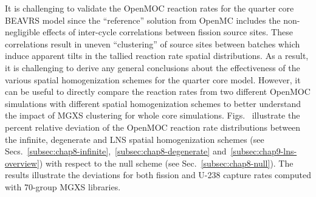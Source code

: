 \begin{appendices}
It is challenging to validate the OpenMOC reaction rates for the quarter core \ac{BEAVRS} model since the ``reference'' solution from OpenMC includes the non-negligible effects of inter-cycle correlations between fission source sites. These correlations result in uneven ``clustering'' of source sites between batches which induce apparent tilts in the tallied reaction rate spatial distributions. As a result, it is challenging to derive any general conclusions about the effectiveness of the various spatial homogenization schemes for the quarter core model. However, it can be useful to directly compare the reaction rates from two different OpenMOC simulations with different spatial homogenization schemes to better understand the impact of \ac{MGXS} clustering for whole core simulations. Figs.~ illustrate the percent relative deviation of the OpenMOC reaction rate distributions between the infinite, degenerate and \ac{LNS} spatial homogenization schemes (see Secs.~\ref{subsec:chap8-infinite},~\ref{subsec:chap8-degenerate} and~\ref{subsec:chap9-lns-overview}) with respect to the null scheme (see Sec.~\ref{subsec:chap8-null}). The results illustrate the deviations for both fission and U-238 capture rates computed with 70-group \ac{MGXS} libraries.


\end{appendices}
